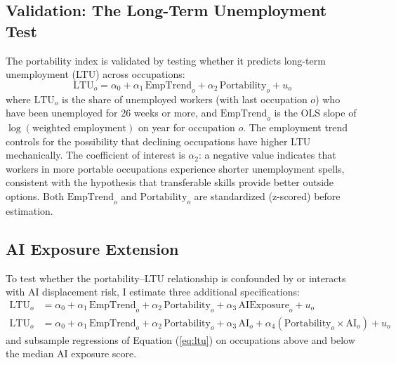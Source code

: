 \documentclass[12pt]{article}
\begin{document}
\subsection{Validation: The Long-Term Unemployment Test}
\label{sec:strategy_ltu}

The portability index is validated by testing whether it predicts long-term unemployment (LTU) across occupations:
\begin{equation}
\label{eq:ltu}
\text{LTU}_o = \alpha_0 + \alpha_1 \, \text{EmpTrend}_o + \alpha_2 \, \text{Portability}_o + u_o
\end{equation}
where $\text{LTU}_o$ is the share of unemployed workers (with last occupation $o$) who have been unemployed for 26 weeks or more, and $\text{EmpTrend}_o$ is the OLS slope of $\log(\text{weighted employment})$ on year for occupation $o$. The employment trend controls for the possibility that declining occupations have higher LTU mechanically. The coefficient of interest is $\alpha_2$: a negative value indicates that workers in more portable occupations experience shorter unemployment spells, consistent with the hypothesis that transferable skills provide better outside options. Both $\text{EmpTrend}_o$ and $\text{Portability}_o$ are standardized (z-scored) before estimation.

\subsection{AI Exposure Extension}
\label{sec:strategy_ai}

To test whether the portability--LTU relationship is confounded by or interacts with AI displacement risk, I estimate three additional specifications:
\begin{align}
\text{LTU}_o &= \alpha_0 + \alpha_1 \, \text{EmpTrend}_o + \alpha_2 \, \text{Portability}_o + \alpha_3 \, \text{AIExposure}_o + u_o \label{eq:ai_additive} \\
\text{LTU}_o &= \alpha_0 + \alpha_1 \, \text{EmpTrend}_o + \alpha_2 \, \text{Portability}_o + \alpha_3 \, \text{AI}_o + \alpha_4 (\text{Portability}_o \times \text{AI}_o) + u_o \label{eq:ai_interaction}
\end{align}
and subsample regressions of Equation (\ref{eq:ltu}) on occupations above and below the median AI exposure score.
\end{document}
